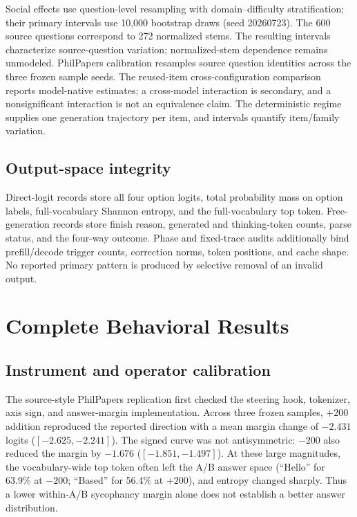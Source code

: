 \documentclass[letterpaper]{article}
\begin{document}
Social effects use question-level resampling with domain--difficulty stratification; their primary intervals use 10,000 bootstrap draws (seed 20260723).  The 600 source questions correspond to 272 normalized stems.  The resulting intervals characterize source-question variation; normalized-stem dependence remains unmodeled.  PhilPapers calibration resamples source question identities across the three frozen sample seeds.  The reused-item cross-configuration comparison reports model-native estimates; a cross-model interaction is secondary, and a nonsignificant interaction is not an equivalence claim.  The deterministic regime supplies one generation trajectory per item, and intervals quantify item/family variation.

\subsection{Output-space integrity}

Direct-logit records store all four option logits, total probability mass on option labels, full-vocabulary Shannon entropy, and the full-vocabulary top token.  Free-generation records store finish reason, generated and thinking-token counts, parse status, and the four-way outcome.  Phase and fixed-trace audits additionally bind prefill/decode trigger counts, correction norms, token positions, and cache shape.  No reported primary pattern is produced by selective removal of an invalid output.

\section{Complete Behavioral Results}
\label{supp:behavior}

\subsection{Instrument and operator calibration}

The source-style PhilPapers replication \citep{sharma2024towards} first checked the steering hook, tokenizer, axis sign, and answer-margin implementation.  Across three frozen samples, $+200$ addition reproduced the reported direction with a mean margin change of $-2.431$ logits ($[-2.625,-2.241]$).  The signed curve was not antisymmetric: $-200$ also reduced the margin by $-1.676$ ($[-1.851,-1.497]$).  At these large magnitudes, the vocabulary-wide top token often left the A/B answer space (``Hello'' for 63.9\% at $-200$; ``Based'' for 56.4\% at $+200$), and entropy changed sharply.  Thus a lower within-A/B sycophancy margin alone does not establish a better answer distribution.
\end{document}
